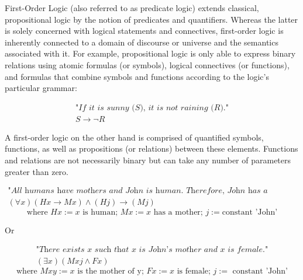 First-Order Logic (also referred to as predicate logic) extends classical, propositional logic by the notion of predicates and quantifiers.
Whereas the latter is solely concerned with logical statements and connectives, first-order logic is inherently connected to a domain of discourse or universe and the semantics associated with it.
For example, propositional logic is only able to express binary relations using atomic formulas (or symbols), logical connectives (or functions), and formulas that combine symbols and functions according to the logic's particular grammar:

\begin{equation*}
    \begin{gathered}
        \textit{"If it is sunny (S), it is not raining (R)."}\\
        S \rightarrow \lnot R
    \end{gathered}
\end{equation*}

A first-order logic on the other hand is comprised of quantified symbols, functions, as well as propositions (or relations) between these elements.
Functions and relations are not necessarily binary but can take any number of parameters greater than zero.

\begin{equation*}
    \begin{gathered}
        \textit{"All humans have mothers and John is human. Therefore, John has a mother."}\\
        (\forall x)(Hx \rightarrow Mx) \wedge (Hj) \rightarrow (Mj)
    \end{gathered}
\end{equation*}
\begin{equation*}
    \text{where }
    Hx:= x \text{ is human; }
    Mx:= x \text{ has a mother; }
    j:= \text{constant 'John'}
\end{equation*}

Or

\begin{equation*}
    \begin{gathered}
        \textit{"There exists x such that x is John's mother and x is female."}\\
        (\exists x)(Mxj \wedge Fx)
    \end{gathered}
\end{equation*}
\begin{equation*}
    \text{where }
    Mxy:= x \text{ is the mother of y; }
    Fx:= x \text{ is female; }
    j:= \text{ constant 'John'}
\end{equation*}

